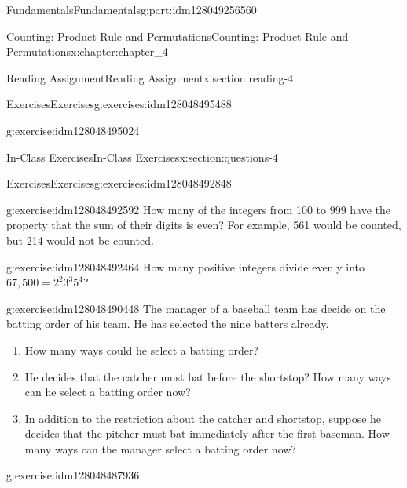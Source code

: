 \documentclass[oneside,10pt,]{book}
\numberwithin{equation}{section}
\begin{document}
\begin{partptx}{Fundamentals}{}{Fundamentals}{}{}{g:part:idm128049256560}
\begin{chapterptx}{Counting: Product Rule and Permutations}{}{Counting: Product Rule and Permutations}{}{}{x:chapter:chapter_4}
\begin{sectionptx}{Reading Assignment}{}{Reading Assignment}{}{}{x:section:reading-4}
\begin{exercises-subsection}{Exercises}{}{Exercises}{}{}{g:exercises:idm128048495488}
\begin{exercisegroup}
\begin{divisionexerciseeg}{2}{}{}{g:exercise:idm128048495024}
\end{divisionexerciseeg}%
\end{exercisegroup}
\par\medskip\noindent
\end{exercises-subsection}
\end{sectionptx}
%
%
\typeout{************************************************}
\typeout{************************************************}
%
\begin{sectionptx}{In-Class Exercises}{}{In-Class Exercises}{}{}{x:section:questions-4}
%
%
%
\typeout{************************************************}
\typeout{************************************************}
%
\begin{exercises-subsection}{Exercises}{}{Exercises}{}{}{g:exercises:idm128048492848}
\par\medskip\noindent%
%
\begin{exercisegroup}
\begin{divisionexerciseeg}{1}{}{}{g:exercise:idm128048492592}%
How many of the integers from 100 to 999 have the property that the sum of their digits is even? For example, 561 would be counted, but 214 would not be counted.%
\end{divisionexerciseeg}%
\begin{divisionexerciseeg}{2}{}{}{g:exercise:idm128048492464}%
How many positive integers divide evenly into \(67,500=2^2 3^3 5^4\)?%
\end{divisionexerciseeg}%
\begin{divisionexerciseeg}{3}{}{}{g:exercise:idm128048490448}%
The manager of a baseball team has decide on the batting order of his team.  He has selected the nine batters already.%
\begin{enumerate}[label=(\alph*)]
\item{}How many ways could he select a batting order?%
\item{}He decides that the catcher must bat before the shortstop?  How many ways can he select a batting order now?%
\item{}In addition to the restriction about the catcher and shortstop, suppose he decides that the pitcher must bat immediately after the first baseman.  How many ways can the manager select a batting order now?%
\end{enumerate}
%
\end{divisionexerciseeg}%
\begin{divisionexerciseeg}{4}{}{}{g:exercise:idm128048487936}%

\end{divisionexerciseeg}
\end{exercisegroup}
\end{exercises-subsection}
\end{sectionptx}
\end{chapterptx}
\end{partptx}
\end{document}
